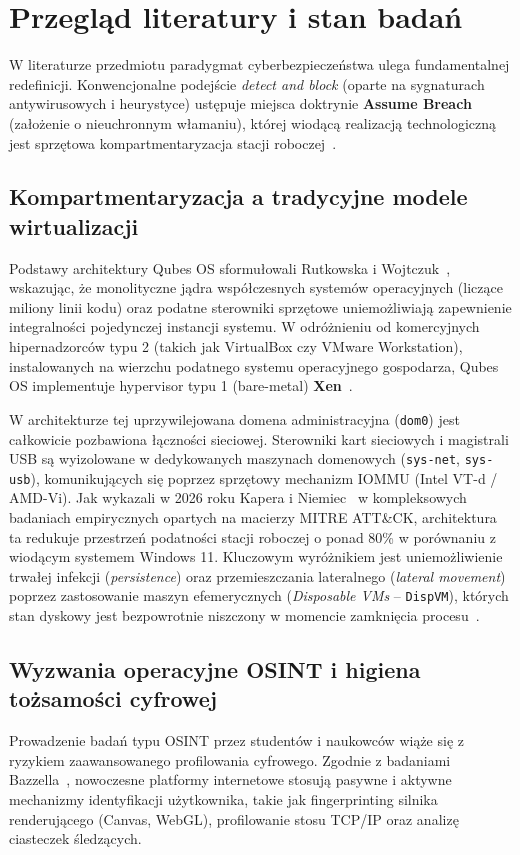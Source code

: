 \section{Przegląd literatury i stan badań}
\label{sec:przeglad_literatury}

W literaturze przedmiotu paradygmat cyberbezpieczeństwa ulega fundamentalnej redefinicji. Konwencjonalne podejście \textit{detect and block} (oparte na sygnaturach antywirusowych i heurystyce) ustępuje miejsca doktrynie \textbf{Assume Breach} (założenie o nieuchronnym włamaniu), której wiodącą realizacją technologiczną jest sprzętowa kompartmentaryzacja stacji roboczej~\cite{rutkowska2010qubes,kapera2026methodology}.

\subsection{Kompartmentaryzacja a tradycyjne modele wirtualizacji}
Podstawy architektury Qubes OS sformułowali Rutkowska i Wojtczuk~\cite{rutkowska2010qubes}, wskazując, że monolityczne jądra współczesnych systemów operacyjnych (liczące miliony linii kodu) oraz podatne sterowniki sprzętowe uniemożliwiają zapewnienie integralności pojedynczej instancji systemu. W odróżnieniu od komercyjnych hipernadzorców typu 2 (takich jak VirtualBox czy VMware Workstation), instalowanych na wierzchu podatnego systemu operacyjnego gospodarza, Qubes OS implementuje hypervisor typu 1 (bare-metal) \textbf{Xen}~\cite{barham2003xen}.

W architekturze tej uprzywilejowana domena administracyjna (\texttt{dom0}) jest całkowicie pozbawiona łączności sieciowej. Sterowniki kart sieciowych i magistrali USB są wyizolowane w dedykowanych maszynach domenowych (\texttt{sys-net}, \texttt{sys-usb}), komunikujących się poprzez sprzętowy mechanizm IOMMU (Intel VT-d / AMD-Vi). Jak wykazali w 2026 roku Kapera i Niemiec~\cite{kapera2026methodology} w kompleksowych badaniach empirycznych opartych na macierzy MITRE ATT\&CK, architektura ta redukuje przestrzeń podatności stacji roboczej o ponad 80\% w porównaniu z wiodącym systemem Windows 11. Kluczowym wyróżnikiem jest uniemożliwienie trwałej infekcji (\textit{persistence}) oraz przemieszczania lateralnego (\textit{lateral movement}) poprzez zastosowanie maszyn efemerycznych (\textit{Disposable VMs} -- \texttt{DispVM}), których stan dyskowy jest bezpowrotnie niszczony w momencie zamknięcia procesu~\cite{kapera2026methodology}.

\subsection{Wyzwania operacyjne OSINT i higiena tożsamości cyfrowej}
Prowadzenie badań typu OSINT przez studentów i naukowców wiąże się z ryzykiem zaawansowanego profilowania cyfrowego. Zgodnie z badaniami Bazzella~\cite{bazzell2023osint}, nowoczesne platformy internetowe stosują pasywne i aktywne mechanizmy identyfikacji użytkownika, takie jak fingerprinting silnika renderującego (Canvas, WebGL), profilowanie stosu TCP/IP oraz analizę ciasteczek śledzących. 

